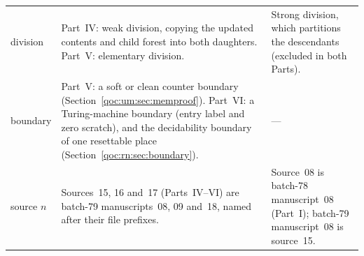 \documentclass[11pt,letterpaper]{article}
\theoremstyle{definition}
\theoremstyle{remark}
\begin{document}
\begin{longtable}{@{}L{0.15\textwidth}L{0.38\textwidth}L{0.38\textwidth}@{}}
division & Part~IV: weak division, copying the updated contents and child forest into both daughters. Part~V: elementary division. & Strong division, which partitions the descendants (excluded in both Parts). \\
boundary & Part~V: a soft or clean counter boundary (Section~\ref{qoc:um:sec:memproof}). Part~VI: a Turing-machine boundary (entry label and zero scratch), and the decidability boundary of one resettable place (Section~\ref{qoc:rn:sec:boundary}). & --- \\
source $n$ & Sources~15, 16 and~17 (Parts~IV--VI) are batch-79 manuscripts~08, 09 and~18, named after their file prefixes. & Source~08 is batch-78 manuscript~08 (Part~I); batch-79 manuscript~08 is source~15. \\
\bottomrule
\end{longtable}
\end{document}
